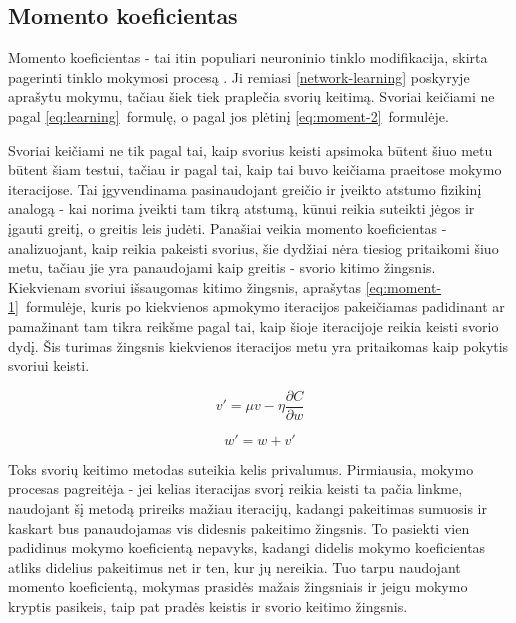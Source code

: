 \documentclass{VUMIFPSbakalaurinis}
\begin{document}
\subsection{Momento koeficientas}

Momento koeficientas - tai itin populiari neuroninio tinklo modifikacija, skirta pagerinti tinklo mokymosi procesą \cite[1218~psl.]{1007668}.
Ji remiasi \ref{network-learning} poskyryje aprašytu mokymu, tačiau šiek tiek praplečia svorių keitimą.
Svoriai keičiami ne pagal \ref{eq:learning}~formulę, o pagal jos plėtinį \ref{eq:moment-2}~formulėje.

Svoriai keičiami ne tik pagal tai, kaip svorius keisti apsimoka būtent šiuo metu būtent šiam testui, tačiau ir pagal tai, kaip tai buvo keičiama praeitose mokymo iteracijose.
Tai įgyvendinama pasinaudojant greičio ir įveikto atstumo fizikinį analogą - kai norima įveikti tam tikrą atstumą, kūnui reikia suteikti jėgos ir įgauti greitį, o greitis leis judėti.
Panašiai veikia momento koeficientas - analizuojant, kaip reikia pakeisti svorius, šie dydžiai nėra tiesiog pritaikomi šiuo metu, tačiau jie yra panaudojami kaip greitis - svorio kitimo žingsnis.
Kiekvienam svoriui išsaugomas kitimo žingsnis, aprašytas \ref{eq:moment-1}~formulėje, kuris po kiekvienos apmokymo iteracijos pakeičiamas padidinant ar pamažinant tam tikra reikšme pagal tai, kaip šioje iteracijoje reikia keisti svorio dydį.
Šis turimas žingsnis kiekvienos iteracijos metu yra pritaikomas kaip pokytis svoriui keisti.

\begin{equation} \label{eq:moment-1}
v' = \mu v - \eta \frac{\partial C}{\partial w}
\end{equation}

\begin{equation} \label{eq:moment-2}
w' = w + v'
\end{equation}

Toks svorių keitimo metodas suteikia kelis privalumus.
Pirmiausia, mokymo procesas pagreitėja - jei kelias iteracijas svorį reikia keisti ta pačia linkme, naudojant šį metodą prireiks mažiau iteracijų, kadangi pakeitimas sumuosis ir kaskart bus panaudojamas vis didesnis pakeitimo žingsnis.
To pasiekti vien padidinus mokymo koeficientą nepavyks, kadangi didelis mokymo koeficientas atliks didelius pakeitimus net ir ten, kur jų nereikia.
Tuo tarpu naudojant momento koeficientą, mokymas prasidės mažais žingsniais ir jeigu mokymo kryptis pasikeis, taip pat pradės keistis ir svorio keitimo žingsnis.
\end{document}
